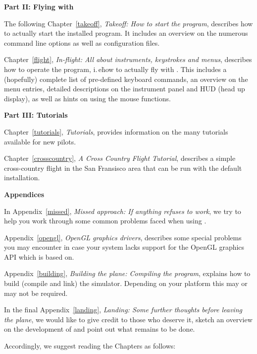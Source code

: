 \noindent
\textbf{Part II: Flying with \FlightGear{}}
\medskip

 \noindent
  The following Chapter~\ref{takeoff}, \textit{Takeoff: How to start the
program}, describes how to actually start the installed program. It includes an overview on the numerous command line options as well as configuration files.
 \medskip

 \noindent
 Chapter~\ref{flight}, \textit{In-flight: All about instruments, keystrokes and menus},
describes how to operate the program, i.\,e\. how to actually fly with
\FlightGear{}\hspace{-1mm}. This includes a (hopefully) complete list of pre-defined keyboard
commands, an overview on the menu entries, detailed descriptions on the instrument panel and
HUD (head up display), as well as hints on using the mouse functions.
 \medskip

\noindent
\textbf{Part III: Tutorials}
\medskip

 \noindent
 Chapter~\ref{tutorials}, \textit{Tutorials},
provides information on the many tutorials available for new pilots.
 \medskip

 \noindent
 Chapter~\ref{crosscountry}, \textit{A Cross Country Flight Tutorial},
describes a simple cross-country flight in the San Fransisco area that can be run with the default installation.
 \medskip

\noindent
\textbf{Appendices}
\medskip

 \noindent
  In Appendix~\ref{missed}, \textit{Missed approach: If anything refuses to work},
   we try to help you work through some common problems faced when using \FlightGear{}.
 \bigskip

 \noindent
Appendix~\ref{opengl}, \textit{OpenGL graphics drivers}, describes some special problems you may encounter in case your system lacks support for the OpenGL graphics API  which \FlightGear{} is based on. 
 \medskip

 \noindent
 Appendix~\ref{building}, \textit{Building the plane: Compiling the program},
explains how to build (compile and link) the simulator. Depending on your platform this
may or may not be required. 
 \medskip

 \noindent
  In the final Appendix~\ref{landing}, \textit{Landing: Some further thoughts before leaving the plane}, we would like to give credit to those who deserve it, sketch an overview
on the development of \FlightGear and point out what remains to be done.
 \medskip

 \noindent
 Accordingly, we suggest reading the Chapters as follows:
 \medskip


